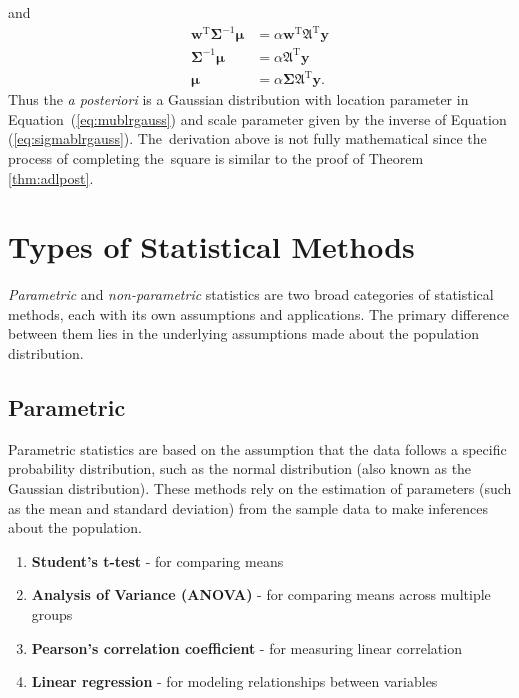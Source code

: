 and
\begin{align}
    \mathbf{w}^{\text{T}}\boldsymbol{\Sigma}^{-1}\boldsymbol{\mu}&=\alpha\mathbf{w}^{\text{T}}\boldsymbol{\mathfrak{A}}^{\text{T}}\mathbf{y}\\
    \boldsymbol{\Sigma}^{-1}\boldsymbol{\mu}&=\alpha\boldsymbol{\mathfrak{A}}^{\text{T}}\mathbf{y}\\
    \boldsymbol{\mu}&=\alpha\boldsymbol{\Sigma}\boldsymbol{\mathfrak{A}}^{\text{T}}\mathbf{y}.\label{eq:mublrgauss}
\end{align}
Thus the \textit{a posteriori} is a Gaussian distribution with location parameter in \mbox{Equation (\ref{eq:mublrgauss})} and scale parameter given by the inverse of Equation (\ref{eq:sigmablrgauss}). \mbox{The derivation} above is not fully mathematical since the process of completing \mbox{the square} is similar to the proof of Theorem \ref{thm:adlpost}.
\section{Types of Statistical Methods}
\textit{Parametric} and \textit{non-parametric} statistics are two broad categories of statistical methods, each with its own assumptions and applications. The primary difference between them lies in the underlying assumptions made about the population distribution.
\subsection{Parametric}
Parametric statistics are based on the assumption that the data follows a specific probability distribution, such as the normal distribution (also known as the Gaussian distribution). These methods rely on the estimation of parameters (such as the mean and standard deviation) from the sample data to make inferences about the population.
\begin{enumerate}
    \item \textbf{Student's t-test} - for comparing means
    \item \textbf{Analysis of Variance (ANOVA)} - for comparing means across multiple groups
    \item \textbf{Pearson's correlation coefficient} - for measuring linear correlation
    \item \textbf{Linear regression} - for modeling relationships between variables
\end{enumerate}
